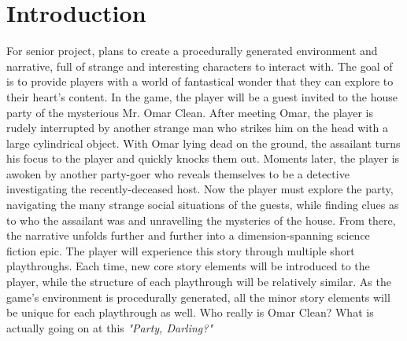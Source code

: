 \documentclass{GlobalDocument}
\begin{document}
\setcounter{secnumdepth}{3}
\linespread{1.0}
\setlength{\parskip}{0em}

\renewcommand*\contentsname{Table of Contents}
\tableofcontents

\listoffigures

\linespread{1.15}
\setlength{\parskip}{1.15em}
\normalsize

\chapter{Introduction}
For senior project, \ourteam{} plans to create a procedurally generated environment and narrative, full of strange and interesting characters to interact with. The goal of \ourgame{} is to provide players with a world of fantastical wonder that they can explore to their heart's content. In the game, the player will be a guest invited to the house party of the mysterious Mr. Omar Clean. After meeting Omar, the player is rudely interrupted by another strange man who strikes him on the head with a large cylindrical object. With Omar lying dead on the ground, the assailant turns his focus to the player and quickly knocks them out. Moments later, the player is awoken by another party-goer who reveals themselves to be a detective investigating the recently-deceased host. Now the player must explore the party, navigating the many strange social situations of the guests, while finding clues as to who the assailant was and unravelling the mysteries of the house. From there, the narrative unfolds further and further into a dimension-spanning science fiction epic. The player will experience this story through multiple short playthroughs. Each time, new core story elements will be introduced to the player, while the structure of each playthrough will be relatively similar. As the game's environment is procedurally generated, all the minor story elements will be unique for each playthrough as well. Who really is Omar Clean? What is actually going on at this \textit{"Party, Darling?"}
\end{document}
